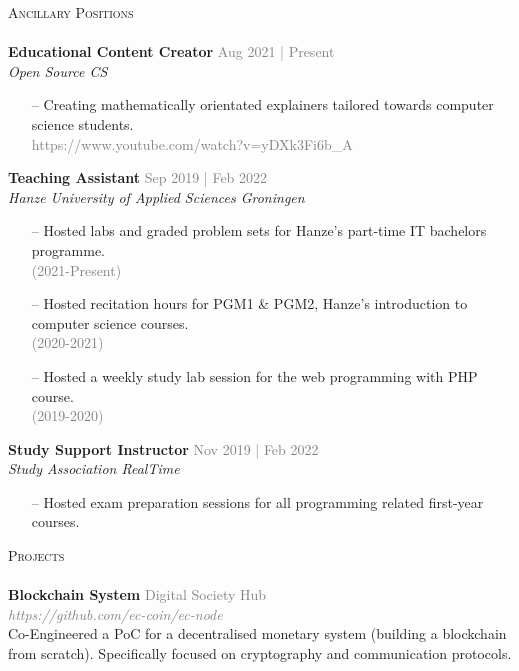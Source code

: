 \documentclass[a4paper]{article}
\newcommand{\lineunder} {
    \vspace*{-8pt} \\
    \hspace*{-18pt} \hrulefill \\
}
\newcommand{\header} [1] {
    {\hspace*{-18pt}\vspace*{6pt} \textsc{#1}}
    \vspace*{-6pt} \lineunder
}
\begin{document}
\header{Ancillary Positions}
\vspace{1mm}
\textbf{Educational Content Creator} \hfill \textcolor{gray}{Aug 2021 | Present}\\
\textit{Open Source CS}\\
\vspace{-2mm}
\begin{itemize} \itemsep 1pt
	\item[--] Creating mathematically orientated explainers tailored towards computer science students.\\
		\textcolor{gray}{https://www.youtube.com/watch?v=yDXk3Fi6b\_A}
\end{itemize}
\textbf{Teaching Assistant} \hfill \textcolor{gray}{Sep 2019 | Feb 2022}\\
\textit{Hanze University of Applied Sciences Groningen}\\
\vspace{-2mm}
\begin{itemize} \itemsep 1pt
	\item[--] Hosted labs and graded problem sets for Hanze’s part-time IT bachelors programme.\\ \textcolor{gray}{(2021-Present)}
	\item[--] Hosted recitation hours for PGM1 \& PGM2, Hanze’s introduction to computer science courses.\\\textcolor{gray}{(2020-2021)}
	\item[--]Hosted a weekly study lab session for the web programming with PHP course.\\
		\textcolor{gray}{(2019-2020)}
\end{itemize}
\textbf{Study Support Instructor} \hfill \textcolor{gray}{Nov 2019 | Feb 2022}\\
\textit{Study Association RealTime}\\
\vspace{-2mm}
\begin{itemize} \itemsep 1pt
	\item[--] Hosted exam preparation sessions for all programming related first-year courses.
\end{itemize}

\vspace{5mm}

\header{Projects}
{\textbf{Blockchain System}} \hfill \textcolor{gray}{Digital Society Hub}\\
\textcolor{gray}{\emph{https://github.com/ec-coin/ec-node}}\\
Co-Engineered a PoC for a decentralised monetary system (building a blockchain from scratch). Specifically focused on cryptography and communication protocols.
\vspace*{2mm}
\end{document}
